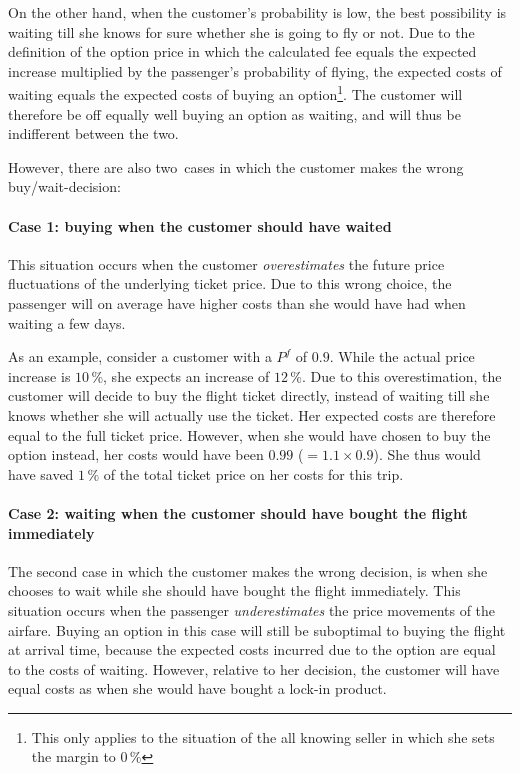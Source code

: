 On the other hand, when the customer's probability is low, the best possibility is waiting till she knows for sure whether she is going to fly or not. Due to the definition of the option price in which the calculated fee equals the expected increase multiplied by the passenger's probability of flying, the expected costs of waiting equals the expected costs of buying an option\footnote{This only applies to the situation of the all knowing seller in which she sets the margin to $0\,\%$}. The customer will therefore be off equally well buying an option as waiting, and will thus be indifferent between the two.

However, there are also two~cases in which the customer makes the wrong buy/wait-decision:

\paragraph{Case 1: buying when the customer should have waited}

This situation occurs when the customer \emph{overestimates} the future price fluctuations of the underlying ticket price. Due to this wrong choice, the passenger will on average have higher costs than she would have had when waiting a few days.

As an example, consider a customer with a $P^f$ of $0.9$. While the actual price increase is $10\,\%$, she expects an increase of $12\,\%$. Due to this overestimation, the customer will decide to buy the flight ticket directly, instead of waiting till she knows whether she will actually use the ticket. Her expected costs are therefore equal to the full ticket price. However, when she would have chosen to buy the option instead, her costs would have been $0.99$ ($= 1.1 \times 0.9$). She thus would have saved $1\,\%$ of the total ticket price on her costs for this trip.

\paragraph{Case 2: waiting when the customer should have bought the flight immediately}

The second case in which the customer makes the wrong decision, is when she chooses to wait while she should have bought the flight immediately. This situation occurs when the passenger \emph{underestimates} the price movements of the airfare. Buying an option in this case will still be suboptimal to buying the flight at arrival time, because the expected costs incurred due to the option are equal to the costs of waiting. However, relative to her decision, the customer will have equal costs as when she would have bought a lock-in product.

